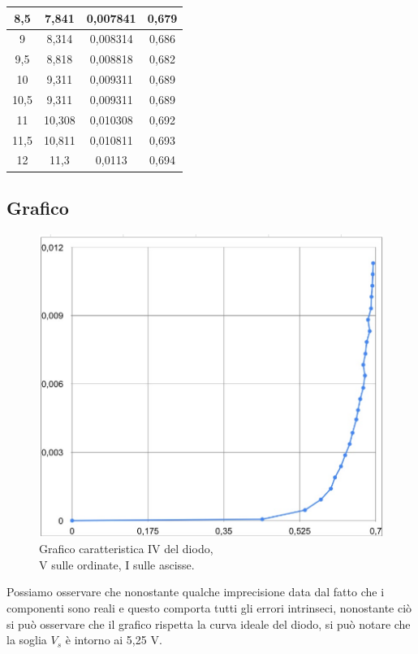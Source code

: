 \documentclass[12pt]{article}
\begin{document}
\begin{table}[H]
\begin{tabular}{|c|c|c|c|}
            \hline
            \rowcolor{TealBlue!70} 8,5  & 7,841 &  0,007841   &  0,679 \\
            \hline
            \rowcolor{Orange!70} 9 & 8,314 & 0,008314  &  0,686 \\
            \hline
            \rowcolor{TealBlue!70} 9,5  & 8,818 &   0,008818  & 0,682  \\
            \hline
            \rowcolor{Orange!70} 10 & 9,311 & 0,009311  &  0,689 \\
            \hline
            \rowcolor{TealBlue!70} 10,5  & 9,311 &  0,009311   &  0,689 \\
            \hline
            \rowcolor{Orange!70} 11 & 10,308 &  0,010308 &  0,692 \\
            \hline
            \rowcolor{TealBlue!70} 11,5  & 10,811 &  0,010811   &0,693   \\
            \hline
            \rowcolor{Orange!70} 12 & 11,3 & 0,0113  & 0,694  \\
            \hline
        \end{tabular}
    \end{table}
    \subsection{Grafico}
    \begin{figure}[!h]
        \centering
        \includegraphics[scale=0.8]{media/graph.png}
        \caption{Grafico caratteristica IV del diodo,\\ V sulle ordinate, I sulle ascisse.}
    \end{figure}
    Possiamo osservare che nonostante qualche imprecisione data dal fatto che i componenti sono reali e questo comporta tutti gli 
    errori intrinseci, nonostante ciò si può osservare che il grafico rispetta la curva ideale del diodo, si può notare che la soglia $V_s$
    è intorno ai 5,25 V.\\
\end{document}
